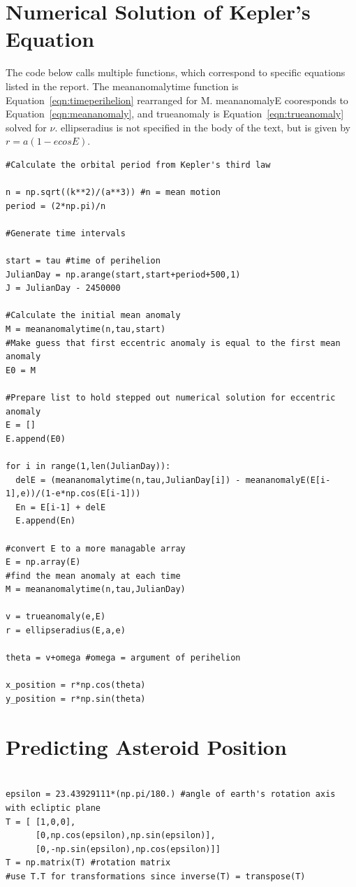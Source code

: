 \documentclass[a4paper,12pt]{article}
\begin{document}
\begin{appendices}
\section{Numerical Solution of Kepler's Equation}
\label{app:kepler}

The code below calls multiple functions, which correspond to specific equations listed in the report. The meananomalytime function is Equation~\ref{eqn:timeperihelion} rearranged for M. meananomalyE cooresponds to Equation~\ref{eqn:meananomaly}, and trueanomaly is Equation~\ref{eqn:trueanomaly} solved for $\nu$. ellipseradius is not specified in the body of the text, but is given by $r=a(1-ecosE)$.

\footnotesize\begin{verbatim}
#Calculate the orbital period from Kepler's third law

n = np.sqrt((k**2)/(a**3)) #n = mean motion
period = (2*np.pi)/n

#Generate time intervals

start = tau #time of perihelion
JulianDay = np.arange(start,start+period+500,1)
J = JulianDay - 2450000

#Calculate the initial mean anomaly
M = meananomalytime(n,tau,start)
#Make guess that first eccentric anomaly is equal to the first mean anomaly
E0 = M

#Prepare list to hold stepped out numerical solution for eccentric anomaly
E = []
E.append(E0)

for i in range(1,len(JulianDay)):
  delE = (meananomalytime(n,tau,JulianDay[i]) - meananomalyE(E[i-1],e))/(1-e*np.cos(E[i-1]))
  En = E[i-1] + delE
  E.append(En)

#convert E to a more managable array
E = np.array(E)
#find the mean anomaly at each time
M = meananomalytime(n,tau,JulianDay)

v = trueanomaly(e,E)
r = ellipseradius(E,a,e)

theta = v+omega #omega = argument of perihelion

x_position = r*np.cos(theta)
y_position = r*np.sin(theta)
\end{verbatim}
\normalsize
\newpage
\section{Predicting Asteroid Position}
\label{app:predict}
\footnotesize\begin{verbatim}

epsilon = 23.43929111*(np.pi/180.) #angle of earth's rotation axis with ecliptic plane
T = [ [1,0,0],
      [0,np.cos(epsilon),np.sin(epsilon)],
      [0,-np.sin(epsilon),np.cos(epsilon)]]
T = np.matrix(T) #rotation matrix
#use T.T for transformations since inverse(T) = transpose(T)


\end{verbatim}
\end{appendices}
\end{document}

